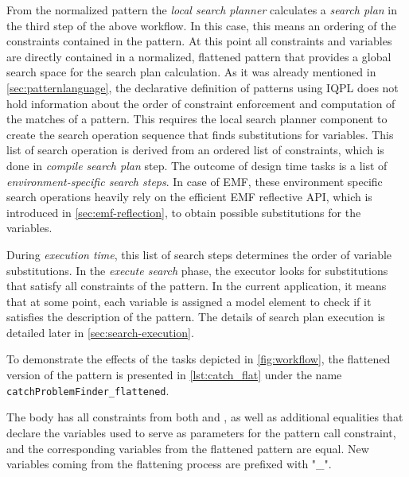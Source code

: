 From the normalized pattern the \emph{local search planner} calculates a \emph{search plan} in the third step of the above workflow. In this case, this means an ordering of the constraints contained in the pattern. At this point all constraints and variables are directly contained in a normalized, flattened pattern that provides a global search space for the search plan calculation. As it was already mentioned in \autoref{sec:patternlanguage}, the declarative definition of patterns using IQPL does not hold information about the order of constraint enforcement and computation of the matches of a pattern. This requires the local search planner component to create the search operation sequence that finds substitutions for variables. This list of search operation is derived from an ordered list of constraints, which is done in \emph{compile search plan} step. The outcome of design time tasks is a list of \emph{environment-specific search steps}. In case of EMF, these environment specific search operations heavily rely on the efficient EMF reflective API, which is introduced in \autoref{sec:emf-reflection}, to obtain possible substitutions for the variables.

During \emph{execution time}, this list of search steps determines the order of variable substitutions. In the \emph{execute search} phase, the executor looks for substitutions that satisfy all constraints of the pattern. In the current application, it means that at some point, each variable is assigned a model element to check if it satisfies the description of the pattern. The details of search plan execution is detailed later in \autoref{sec:search-execution}.

To demonstrate the effects of the tasks depicted in \autoref{fig:workflow}, the flattened version of the \catchproblem pattern is presented in \autoref{lst:catch_flat} under the name \mbox{\texttt{catchProblemFinder\_flattened}}. 

\begin{figure}[!htbp]
\end{figure}

The body has all constraints from both \catchproblem and \handlervar, as well as additional equalities that declare the variables used to serve as parameters for the pattern call constraint, and the corresponding variables from the flattened pattern are equal. New variables coming from the flattening process are prefixed with "\handlervar\_".


